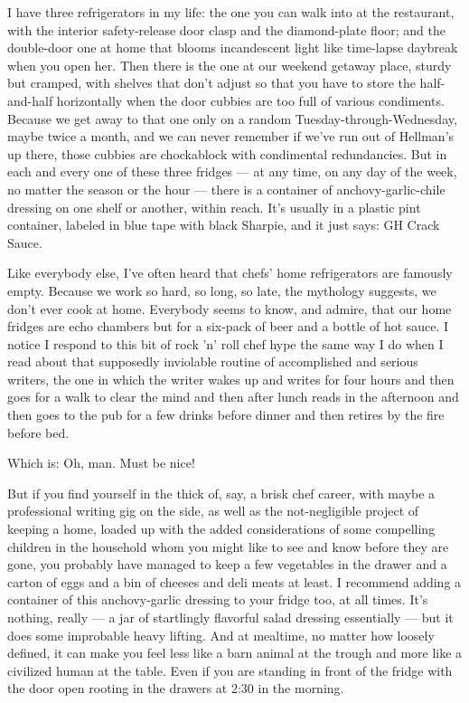 I have three refrigerators in my life: the one you can walk into at the
restaurant, with the interior safety-release door clasp and the
diamond-plate floor; and the double-door one at home that blooms
incandescent light like time-lapse daybreak when you open her. Then
there is the one at our weekend getaway place, sturdy but cramped, with
shelves that don't adjust so that you have to store the half-and-half
horizontally when the door cubbies are too full of various condiments.
Because we get away to that one only on a random
Tuesday-through-Wednesday, maybe twice a month, and we can never
remember if we've run out of Hellman's up there, those cubbies are
chockablock with condimental redundancies. But in each and every one of
these three fridges --- at any time, on any day of the week, no matter
the season or the hour --- there is a container of anchovy-garlic-chile
dressing on one shelf or another, within reach. It's usually in a
plastic pint container, labeled in blue tape with black Sharpie, and it
just says: GH Crack Sauce.

Like everybody else, I've often heard that chefs' home refrigerators are
famously empty. Because we work so hard, so long, so late, the mythology
suggests, we don't ever cook at home. Everybody seems to know, and
admire, that our home fridges are echo chambers but for a six-pack of
beer and a bottle of hot sauce. I notice I respond to this bit of rock
'n' roll chef hype the same way I do when I read about that supposedly
inviolable routine of accomplished and serious writers, the one in which
the writer wakes up and writes for four hours and then goes for a walk
to clear the mind and then after lunch reads in the afternoon and then
goes to the pub for a few drinks before dinner and then retires by the
fire before bed.

Which is: Oh, man. Must be nice!

But if you find yourself in the thick of, say, a brisk chef career, with
maybe a professional writing gig on the side, as well as the
not-negligible project of keeping a home, loaded up with the added
considerations of some compelling children in the household whom you
might like to see and know before they are gone, you probably have
managed to keep a few vegetables in the drawer and a carton of eggs and
a bin of cheeses and deli meats at least. I recommend adding a container
of this anchovy-garlic dressing to your fridge too, at all times. It's
nothing, really --- a jar of startlingly flavorful salad dressing
essentially --- but it does some improbable heavy lifting. And at
mealtime, no matter how loosely defined, it can make you feel less like
a barn animal at the trough and more like a civilized human at the
table. Even if you are standing in front of the fridge with the door
open rooting in the drawers at 2:30 in the morning.

